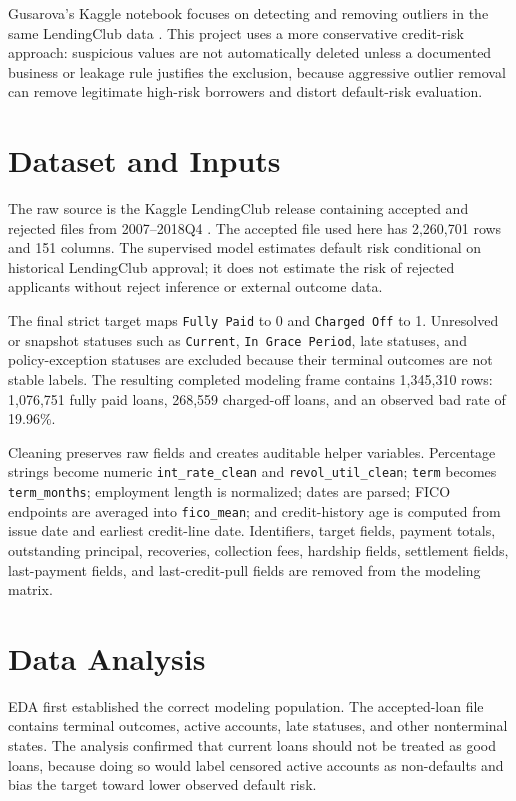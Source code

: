 \documentclass[11pt]{article}
\begin{document}
Gusarova's Kaggle notebook focuses on detecting and removing outliers in the same LendingClub data \cite{kaggleoutliers}. This project uses a more conservative credit-risk approach: suspicious values are not automatically deleted unless a documented business or leakage rule justifies the exclusion, because aggressive outlier removal can remove legitimate high-risk borrowers and distort default-risk evaluation.

\section{Dataset and Inputs}
The raw source is the Kaggle LendingClub release containing accepted and rejected files from 2007--2018Q4 \cite{kaggledata}. The accepted file used here has 2,260,701 rows and 151 columns. The supervised model estimates default risk conditional on historical LendingClub approval; it does not estimate the risk of rejected applicants without reject inference or external outcome data.

The final strict target maps \texttt{Fully Paid} to 0 and \texttt{Charged Off} to 1. Unresolved or snapshot statuses such as \texttt{Current}, \texttt{In Grace Period}, late statuses, and policy-exception statuses are excluded because their terminal outcomes are not stable labels. The resulting completed modeling frame contains 1,345,310 rows: 1,076,751 fully paid loans, 268,559 charged-off loans, and an observed bad rate of 19.96\%.

Cleaning preserves raw fields and creates auditable helper variables. Percentage strings become numeric \texttt{int\_rate\_clean} and \texttt{revol\_util\_clean}; \texttt{term} becomes \texttt{term\_months}; employment length is normalized; dates are parsed; FICO endpoints are averaged into \texttt{fico\_mean}; and credit-history age is computed from issue date and earliest credit-line date. Identifiers, target fields, payment totals, outstanding principal, recoveries, collection fees, hardship fields, settlement fields, last-payment fields, and last-credit-pull fields are removed from the modeling matrix.

\section{Data Analysis}
EDA first established the correct modeling population. The accepted-loan file contains terminal outcomes, active accounts, late statuses, and other nonterminal states. The analysis confirmed that current loans should not be treated as good loans, because doing so would label censored active accounts as non-defaults and bias the target toward lower observed default risk.
\end{document}
